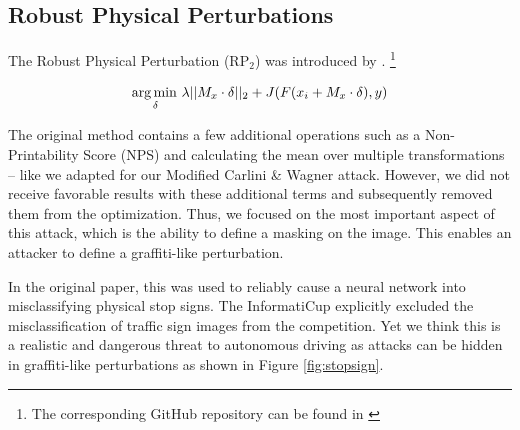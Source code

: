 \subsection{Robust Physical Perturbations}\label{subsec:robustphysical}

The Robust Physical Perturbation (RP$_2$) was introduced by \citet{eykholt2018robust}.
\footnote{The corresponding GitHub repository can be found in \cite{rp2repo}}

\begin{equation}
\operatorname*{arg\,min\,}_\delta \lambda ||M_x \cdot \delta||_2 + J(F(x_i + M_x \cdot \delta), y)
\end{equation}

The original method contains a few additional operations such as a Non-Printability Score (NPS) and calculating the mean over multiple transformations -- like we adapted for our Modified Carlini \& Wagner attack.
However, we did not receive favorable results with these additional terms and subsequently removed them from the optimization.
Thus, we focused on the most important aspect of this attack, which is the ability to define a masking on the image.
This enables an attacker to define a graffiti-like perturbation.

In the original paper, this was used to reliably cause a neural network into misclassifying physical stop signs.
The InformatiCup explicitly excluded the misclassification of traffic sign images from the competition.
Yet we think this is a realistic and dangerous threat to autonomous driving as attacks can be hidden in graffiti-like perturbations as shown in Figure \ref{fig:stopsign}.

